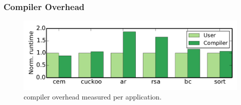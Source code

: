 

\subsubsection{\sys Compiler Overhead}
\label{sec:result_compiler_time}

\begin{figure}
	\centering
	\includegraphics[width=\columnwidth]{figures/comp_user}
	\caption{\sys compiler overhead measured per application.}
	\label{fig:comp_user}
\end{figure}

